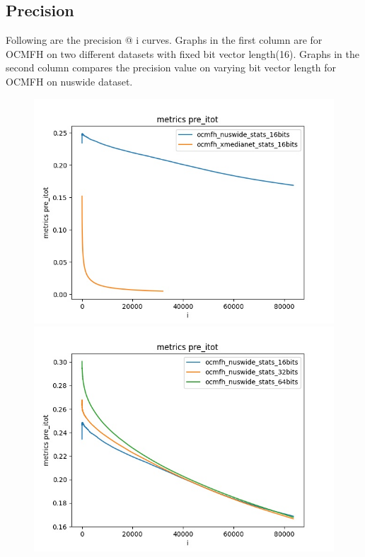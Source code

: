\newpage
\subsection{Precision}
    Following are the precision @ i curves. Graphs in the first column are for OCMFH\cite{ocmfh} on two different datasets with fixed bit vector length(16). Graphs in the second column compares the precision value on varying bit vector length for OCMFH\cite{ocmfh} on nuswide dataset.
        \begin{figure}[H]
            \begin{minipage}[!h]{0.6\linewidth}
                \centering
                \includegraphics[width=\linewidth]{resultsImages/precision/metrics pre_itot_ocmfh_both.jpeg}
            \end{minipage}
            \begin{minipage}[!h]{0.6\linewidth}
                \centering
                \includegraphics[width=\linewidth]{resultsImages/precision/metrics pre_itot_ocmfh_nuswide.jpeg}

\end{minipage}
\end{figure}
